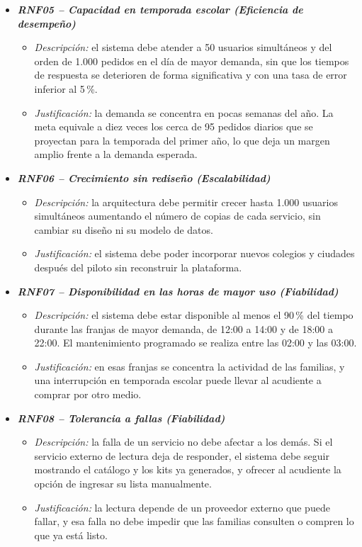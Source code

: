 \begin{itemize}
\item \textbf{\textit{RNF05 -- Capacidad en temporada escolar (Eficiencia de
      desempeño)}}
  \begin{itemize}
    \item \textit{Descripción:} el sistema debe atender a 50 usuarios simultáneos y del
          orden de 1.000 pedidos en el día de mayor demanda, sin que los tiempos de
          respuesta se deterioren de forma significativa y con una tasa de error inferior
          al 5\,\%.
    \item \textit{Justificación:} la demanda se concentra en pocas semanas del año. La
          meta equivale a diez veces los cerca de 95 pedidos diarios que se proyectan para
          la temporada del primer año, lo que deja un margen amplio frente a la demanda
          esperada.
  \end{itemize}

\item \textbf{\textit{RNF06 -- Crecimiento sin rediseño (Escalabilidad)}}
  \begin{itemize}
    \item \textit{Descripción:} la arquitectura debe permitir crecer hasta 1.000 usuarios
          simultáneos aumentando el número de copias de cada servicio, sin cambiar su
          diseño ni su modelo de datos.
    \item \textit{Justificación:} el sistema debe poder incorporar nuevos colegios y
          ciudades después del piloto sin reconstruir la plataforma.
  \end{itemize}

\item \textbf{\textit{RNF07 -- Disponibilidad en las horas de mayor uso (Fiabilidad)}}
  \begin{itemize}
    \item \textit{Descripción:} el sistema debe estar disponible al menos el 90\,\% del
          tiempo durante las franjas de mayor demanda, de 12:00 a 14:00 y de 18:00 a 22:00.
          El mantenimiento programado se realiza entre las 02:00 y las 03:00.
    \item \textit{Justificación:} en esas franjas se concentra la actividad de las familias,
          y una interrupción en temporada escolar puede llevar al acudiente a comprar por
          otro medio.
  \end{itemize}

\item \textbf{\textit{RNF08 -- Tolerancia a fallas (Fiabilidad)}}
  \begin{itemize}
    \item \textit{Descripción:} la falla de un servicio no debe afectar a los demás. Si el
          servicio externo de lectura deja de responder, el sistema debe seguir mostrando
          el catálogo y los kits ya generados, y ofrecer al acudiente la opción de ingresar
          su lista manualmente.
    \item \textit{Justificación:} la lectura depende de un proveedor externo que puede
          fallar, y esa falla no debe impedir que las familias consulten o compren lo que
          ya está listo.
  \end{itemize}
\end{itemize}
